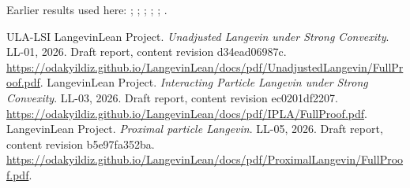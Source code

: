 \documentclass[11pt,a4paper]{article}
\begin{document}
Earlier results used here: \cite[Section~3.13.2]{LangevinLean2026ULASC}; \cite[Section~3.13.3]{LangevinLean2026ULASC}; \cite[Section~3.25.1]{LangevinLean2026ULASC}; \cite[Section~3.18.3]{LangevinLean2026Proximal}; \cite[Section~3.18.4]{LangevinLean2026Proximal}; \cite[Section~3.18.5]{LangevinLean2026Proximal}.

\begin{thebibliography}{ULA-LSI}
LangevinLean Project. \emph{Unadjusted Langevin under Strong Convexity}. LL-01, 2026. Draft report, content revision d34ead06987c. \url{https://odakyildiz.github.io/LangevinLean/docs/pdf/UnadjustedLangevin/FullProof.pdf}.
LangevinLean Project. \emph{Interacting Particle Langevin under Strong Convexity}. LL-03, 2026. Draft report, content revision ec0201df2207. \url{https://odakyildiz.github.io/LangevinLean/docs/pdf/IPLA/FullProof.pdf}.
LangevinLean Project. \emph{Proximal particle Langevin}. LL-05, 2026. Draft report, content revision b5e97fa352ba. \url{https://odakyildiz.github.io/LangevinLean/docs/pdf/ProximalLangevin/FullProof.pdf}.
\end{thebibliography}
\end{document}
